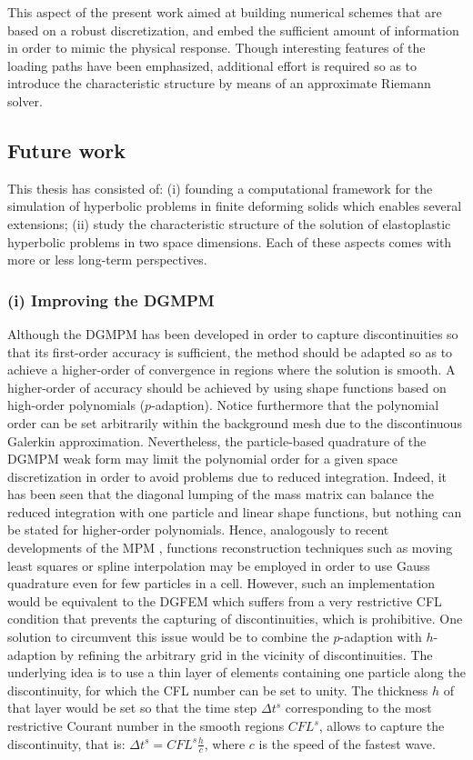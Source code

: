 This aspect of the present work aimed at building numerical schemes that are based on a robust discretization, and embed the sufficient amount of information in order to mimic the physical response.
Though interesting features of the loading paths have been emphasized, additional effort is required so as to introduce the characteristic structure by means of an approximate Riemann solver.


\subsection*{Future work}
This thesis has consisted of: (i) founding a computational framework for the simulation of hyperbolic problems in finite deforming solids which enables several extensions; (ii) study the characteristic structure of the solution of elastoplastic hyperbolic problems in two space dimensions.
Each of these aspects comes with more or less long-term perspectives.

\subsubsection*{(i) Improving the DGMPM}
Although the DGMPM has been developed in order to capture discontinuities so that its first-order accuracy is sufficient, the method should be adapted so as to achieve a higher-order of convergence in regions where the solution is smooth.
A higher-order of accuracy should be achieved by using shape functions based on high-order polynomials ($p$-adaption).
Notice furthermore that the polynomial order can be set arbitrarily within the background mesh due to the discontinuous Galerkin approximation.
Nevertheless, the particle-based quadrature of the DGMPM weak form may limit the polynomial order for a given space discretization in order to avoid problems due to reduced integration.
Indeed, it has been seen that the diagonal lumping of the mass matrix can balance the reduced integration with one particle and linear shape functions, but nothing can be stated for higher-order polynomials.
Hence, analogously to recent developments of the MPM \cite{MPM_BSpline1,MPM_BSpline2,IMPM}, functions reconstruction techniques such as moving least squares or spline interpolation may be employed in order to use Gauss quadrature even for few particles in a cell.
However, such an implementation would be equivalent to the DGFEM which suffers from a very restrictive CFL condition that prevents the capturing of discontinuities, which is prohibitive.
One solution to circumvent this issue would be to combine the $p$-adaption with $h$-adaption by refining the arbitrary grid in the vicinity of discontinuities.
The underlying idea is to use a thin layer of elements containing one particle along the discontinuity, for which the CFL number can be set to unity.
The thickness $h$ of that layer would be set so that the time step $\Delta t^s$ corresponding to the most restrictive Courant number in the smooth regions $CFL^s$, allows to capture the discontinuity, that is: $\Delta t^s = CFL^s \frac{h}{c}$, where $c$ is the speed of the fastest wave.

